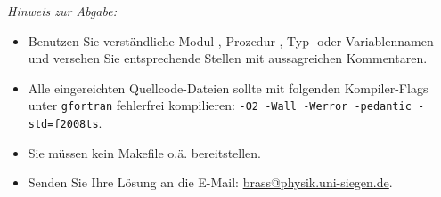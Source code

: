 \textit{Hinweis zur Abgabe:}
\begin{itemize}
\item Benutzen Sie verständliche Modul-, Prozedur-, Typ- oder Variablennamen und versehen Sie entsprechende Stellen mit aussagreichen Kommentaren.
\item Alle eingereichten Quellcode-Dateien sollte mit folgenden Kompiler-Flags unter \verb|gfortran| fehlerfrei kompilieren: \verb|-O2 -Wall -Werror -pedantic -std=f2008ts|.
\item Sie müssen kein Makefile o.ä. bereitstellen.
\item Senden Sie Ihre Lösung an die E-Mail: \url{brass@physik.uni-siegen.de}.
\end{itemize}

